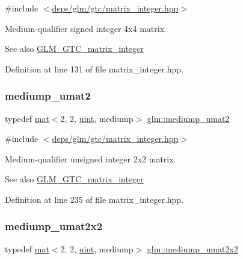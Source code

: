 {\ttfamily \#include $<$\hyperlink{matrix__integer_8hpp}{deps/glm/gtc/matrix\+\_\+integer.\+hpp}$>$}

Medium-\/qualifier signed integer 4x4 matrix. \begin{DoxySeeAlso}{See also}
\hyperlink{group__gtc__matrix__integer}{G\+L\+M\+\_\+\+G\+T\+C\+\_\+matrix\+\_\+integer} 
\end{DoxySeeAlso}


Definition at line 131 of file matrix\+\_\+integer.\+hpp.

\mbox{\label{group__gtc__matrix__integer_gaafd6d236ce051d138e3fdf53de3813e6}} 
\subsubsection{\texorpdfstring{mediump\+\_\+umat2}{mediump\_umat2}}
{\footnotesize\ttfamily typedef \hyperlink{structglm_1_1mat}{mat}$<$2, 2, \hyperlink{group__core__precision_ga4fd29415871152bfb5abd588334147c8}{uint}, mediump$>$ \hyperlink{group__gtc__matrix__integer_gaafd6d236ce051d138e3fdf53de3813e6}{glm\+::mediump\+\_\+umat2}}



{\ttfamily \#include $<$\hyperlink{matrix__integer_8hpp}{deps/glm/gtc/matrix\+\_\+integer.\+hpp}$>$}

Medium-\/qualifier unsigned integer 2x2 matrix. \begin{DoxySeeAlso}{See also}
\hyperlink{group__gtc__matrix__integer}{G\+L\+M\+\_\+\+G\+T\+C\+\_\+matrix\+\_\+integer} 
\end{DoxySeeAlso}


Definition at line 235 of file matrix\+\_\+integer.\+hpp.

\mbox{\label{group__gtc__matrix__integer_ga539a528818569c17e68e77afce7755c2}} 
\subsubsection{\texorpdfstring{mediump\+\_\+umat2x2}{mediump\_umat2x2}}
{\footnotesize\ttfamily typedef \hyperlink{structglm_1_1mat}{mat}$<$2, 2, \hyperlink{group__core__precision_ga4fd29415871152bfb5abd588334147c8}{uint}, mediump$>$ \hyperlink{group__gtc__matrix__integer_ga539a528818569c17e68e77afce7755c2}{glm\+::mediump\+\_\+umat2x2}}



